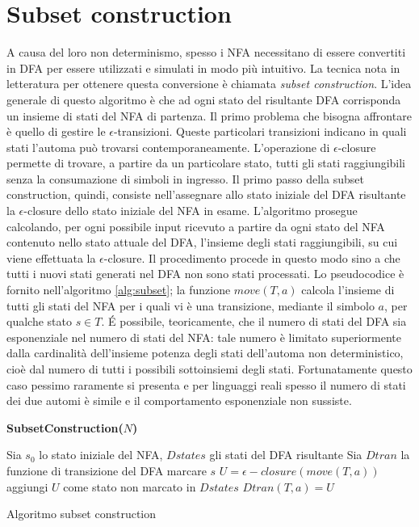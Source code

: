 \section{Subset construction}
A causa del loro non determinismo, spesso i NFA necessitano di essere convertiti in DFA per essere utilizzati e simulati in modo più intuitivo. La tecnica nota in letteratura per ottenere questa conversione è chiamata \emph{subset construction}.
L'idea generale di questo algoritmo è che ad ogni stato del risultante DFA corrisponda un insieme di stati del NFA di partenza.
Il primo problema che bisogna affrontare è quello di gestire le $\epsilon$-transizioni. Queste particolari transizioni indicano in quali stati l'automa può trovarsi contemporaneamente. L'operazione di $\epsilon$-closure permette di trovare, a partire da un particolare stato, tutti gli stati raggiungibili senza la consumazione di simboli in ingresso. Il primo passo della subset construction, quindi, consiste nell'assegnare allo stato iniziale del DFA risultante la $\epsilon$-closure dello stato iniziale del NFA in esame. L'algoritmo prosegue calcolando, per ogni possibile input ricevuto a partire da ogni stato del NFA contenuto nello  stato attuale del DFA, l'insieme degli stati raggiungibili, su cui viene effettuata la $\epsilon$-closure. Il procedimento procede in questo modo sino a che tutti i nuovi stati generati nel DFA non sono stati processati. Lo pseudocodice è fornito nell'algoritmo \ref{alg:subset}; la funzione $move(T,a)$ calcola l'insieme di tutti gli stati del NFA per i quali vi è una transizione, mediante il simbolo $a$, per qualche stato $s \in T$.
\'E possibile, teoricamente, che il numero di stati del DFA sia esponenziale nel numero di stati del NFA: tale numero è limitato superiormente dalla cardinalità dell'insieme potenza degli stati dell'automa non deterministico, cioè dal numero di tutti i possibili sottoinsiemi degli stati.
Fortunatamente questo caso pessimo raramente si presenta e per linguaggi reali spesso il numero di stati dei due automi è simile e il comportamento esponenziale non sussiste.

\begin{algorithm}
\textbf{SubsetConstruction($N$)}
\begin{algorithmic}
\STATE Sia $s_0$ lo stato iniziale del NFA, $Dstates$ gli stati del DFA risultante
\STATE Sia $Dtran$ la funzione di transizione del DFA
	\STATE marcare $s$
		\STATE $U = \epsilon-closure(move(T,a))$
			\STATE aggiungi $U$ come stato non marcato in $Dstates$
		\ENDIF
		\STATE $Dtran(T,a) = U$
	\ENDFOR
\ENDWHILE
\end{algorithmic}
\caption{Algoritmo subset construction}
\label{alg:subset}
\end{algorithm}

